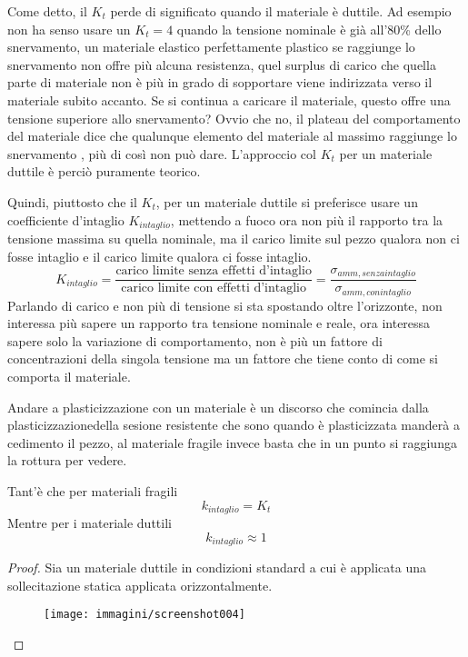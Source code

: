 \documentclass{article}
\begin{document}
\begin{adjustwidth}{2in}{}
		Come detto, il $K_t$ perde di significato quando il materiale è duttile. Ad esempio non ha senso usare un $K_t=4$ quando la tensione nominale è già all'80\% dello snervamento, un materiale elastico perfettamente plastico se raggiunge lo snervamento non offre più alcuna resistenza, quel surplus di carico che quella parte di materiale non è più in grado di sopportare viene indirizzata verso il materiale subito accanto. Se si continua a caricare il materiale, questo offre una tensione superiore allo snervamento? Ovvio che no, il plateau del comportamento del materiale dice che qualunque elemento del materiale al massimo raggiunge lo snervamento , più di così non può dare. L'approccio col $K_t$ per un materiale duttile è perciò puramente teorico. \newline 
		
		Quindi, piuttosto che il $K_t$, per un materiale duttile si preferisce usare un coefficiente d'intaglio $K_{intaglio}$, mettendo a fuoco ora non più il rapporto tra la tensione massima su quella nominale, ma il carico limite sul pezzo qualora non ci fosse intaglio e il carico limite qualora ci fosse intaglio. 
		\[K_{intaglio} = \dfrac{\text{carico limite senza effetti d'intaglio}}{\text{carico limite con effetti d'intaglio}} = \dfrac{\sigma_{amm, senza intaglio}}{\sigma_{amm, con intaglio}}\]
		Parlando di carico e non più di tensione si sta spostando oltre l'orizzonte, non interessa più sapere un rapporto tra tensione nominale e reale, ora interessa sapere solo la variazione di comportamento, non è più un fattore di concentrazioni della singola tensione ma un fattore che tiene conto di come si comporta il materiale. \newline 
		
		Andare a plasticizzazione con un materiale è un discorso che comincia dalla plasticizzazionedella sesione resistente che sono quando è plasticizzata manderà a cedimento il pezzo, al materiale fragile invece basta che in un punto si raggiunga la rottura per vedere. 
		
		Tant'è che per materiali fragili  
		\[k_{intaglio} = K_t\]
		Mentre per i materiale duttili 
		\[k_{intaglio} \approx 1\]
		\begin{proof}
			Sia un materiale duttile in condizioni standard a cui è applicata una sollecitazione statica applicata orizzontalmente. 
			
			\begin{figure}[H]
				\centering
				\texttt{[image: immagini/screenshot004]}
				\label{fig:screenshot004}
			\end{figure}
			

\end{proof}
\end{adjustwidth}
\end{document}
